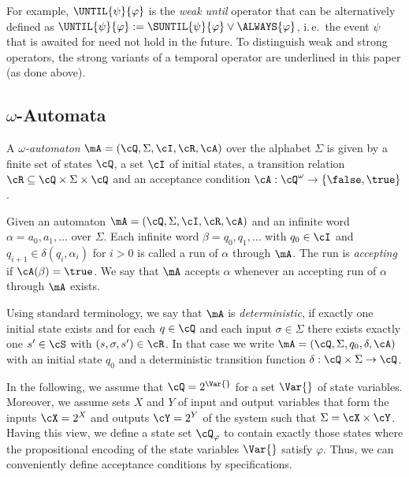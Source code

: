\documentclass[submission,copyright,creativecommons]{eptcs}
\newcommand{\ie}{i.\,e.~}
\begin{document}
\noindent For example, $\UNTIL{\psi}{\varphi}$ is the \emph{weak until} operator that can be alternatively defined as $\UNTIL{\psi}{\varphi}:=\SUNTIL{\psi}{\varphi} \vee \ALWAYS{\varphi}$, \ie the event $\psi$ that is awaited for need not hold in the future. To distinguish weak and strong operators, the strong variants of a temporal operator are underlined in this paper (as done above).


\subsection{\texorpdfstring{$\omega$-Automata}{omega-Automata}}

\begin{definition}
A \emph{$\omega$-automaton} $\mA=(\cQ,\Sigma,\cI,\cR,\cA)$ over the alphabet $\Sigma$ is given by a finite set of states $\cQ$, a set $\cI$ of initial states, a transition relation $\cR \subseteq \cQ \times \Sigma \times \cQ$ and an acceptance condition $\cA:\cQ^\omega\rightarrow \{\false,\true\}$.
\end{definition}

Given an automaton $\mA=(\cQ,\Sigma,\cI,\cR,\cA)$ and an infinite word $\alpha=a_0,a_1,\dots$ over $\Sigma$. Each infinite word $\beta=q_0,q_1,\dots$ with $q_0\in \cI$ and $q_{i+1} \in \delta(q_i,\alpha_i)$ for $i>0$ is called a run of $\alpha$ through $\mA$. The run is \emph{accepting} if $\cA(\beta)=\true$. We say that $\mA$ accepts $\alpha$ whenever an accepting run of $\alpha$ through $\mA$ exists.

Using standard terminology, we say that $\mA$ is \emph{deterministic}, if exactly one initial state exists and for each $q \in \cQ$ and each input $\sigma \in \Sigma$ there exists exactly one $s' \in \cS$ with  $(s,\sigma,s') \in \cR$. In that case we write $\mA=(\cQ,\Sigma,q_0,\delta,\cA)$ with an initial state $q_0$ and a deterministic transition function $\delta:\cQ \times \Sigma \rightarrow \cQ$.
 
In the following, we assume that $\cQ=2^\Var{}$ for a set $\Var{}$ of state variables. Moreover, we assume sets $X$ and $Y$ of input and output variables that form the inputs $\cX=2^X$ and outputs $\cY=2^Y$ of the system such that $\Sigma=\cX \times \cY$. Having this view, we define a state set $\cQ_\varphi$ to contain exactly those states where the propositional encoding of the state variables $\Var{}$ satisfy $\varphi$. Thus, we can conveniently define acceptance conditions by \LTL{} specifications.
\end{document}
